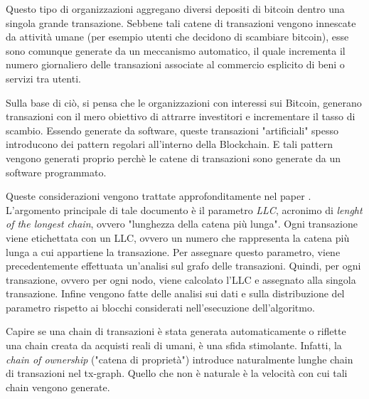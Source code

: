 Questo tipo di organizzazioni aggregano diversi depositi di bitcoin dentro una singola grande transazione.  Sebbene tali catene di transazioni vengono innescate da attività umane (per esempio utenti che decidono di scambiare bitcoin), esse sono comunque generate da un meccanismo automatico, il quale incrementa il numero giornaliero delle transazioni associate al commercio esplicito di beni o servizi tra utenti.

Sulla base di ciò, si pensa che le organizzazioni con interessi sui Bitcoin, generano transazioni con il mero obiettivo di attrarre investitori e incrementare il tasso di scambio. Essendo generate da software, queste transazioni "artificiali" spesso introducono dei pattern regolari all'interno della Blockchain. E tali pattern vengono generati proprio perchè le catene di transazioni sono generate da un software programmato. 

Queste considerazioni vengono trattate approfonditamente nel paper \cite{ddp-ltcbh-17}. L'argomento principale di tale documento è il parametro \textit{LLC}, acronimo di \textit{lenght of the longest chain}, ovvero "lunghezza della catena più lunga". Ogni transazione viene etichettata con un LLC, ovvero un numero che rappresenta la catena più lunga a cui appartiene la transazione. Per assegnare questo parametro, viene precedentemente effettuata un'analisi sul grafo delle transazioni. Quindi, per ogni transazione, ovvero per ogni nodo, viene calcolato l'LLC e assegnato alla singola transazione. Infine vengono fatte delle analisi sui dati e sulla distribuzione del parametro rispetto ai blocchi considerati nell'esecuzione dell'algoritmo.

Capire se una chain di transazioni è stata generata automaticamente o riflette una chain creata da acquisti reali di umani, è una sfida stimolante. Infatti, la \textit{chain of ownership} ("catena di proprietà") introduce naturalmente lunghe chain di transazioni nel tx-graph. Quello che non è naturale è la velocità con cui tali chain vengono generate. 
